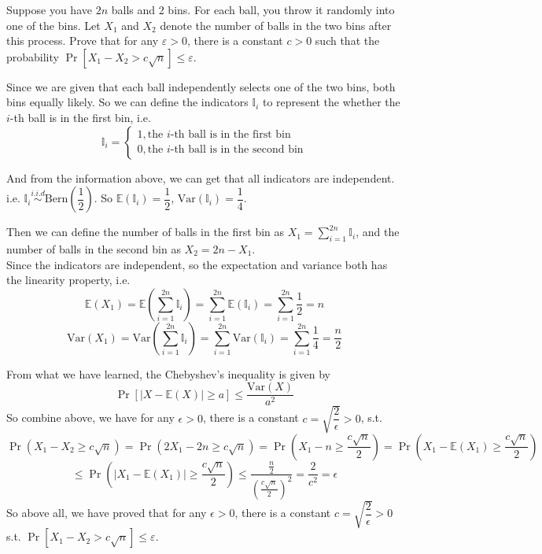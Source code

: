 \problem{}
Suppose you have $2n$ balls and 2 bins.  For each ball, you throw it randomly into one of the bins.  Let $X_1$ and $X_2$ denote the number of balls in the two bins after this process.  Prove that for any  $\varepsilon>0$,  there is a constant  $c>0$  such that the probability $\operatorname{Pr}\left[X_{1}-X_{2}>c \sqrt{n}\right] \leq \varepsilon.$

\solution{}
Since we are given that each ball independently selects one of the two bins, both bins equally likely. So we can define the indicators $\mathbb{I}_i$ to represent the whether the $i$-th ball is in the first bin, i.e.
$$\mathbb{I}_i=\begin{cases}1,\text{the $i$-th ball is in the first bin}\\0,\text{the $i$-th ball is in the second bin}\end{cases}$$

And from the information above, we can get that  all indicators are independent. i.e. $\mathbb{I}_i \stackrel{i.i.d}{\sim} \text{Bern}\left(\dfrac{1}{2}\right)$.
So $\mathbb{E}(\mathbb{I}_i)=\dfrac{1}{2}$, $\text{Var}(\mathbb{I}_i)=\dfrac{1}{4}$.

Then we can define the number of balls in the first bin as $X_1=\sum\limits_{i=1}^{2n}\mathbb{I}_i$, and the number of balls in the second bin as $X_2=2n-X_1$.\\
Since the indicators are independent, so the expectation and variance both has the linearity property, i.e.
$$\mathbb{E}(X_1)=\mathbb{E}\left(\sum\limits_{i=1}^{2n}\mathbb{I}_i\right)=\sum\limits_{i=1}^{2n}\mathbb{E}(\mathbb{I}_i)=\sum\limits_{i=1}^{2n}\dfrac{1}{2}=n$$
$$\text{Var}(X_1)=\text{Var}\left(\sum\limits_{i=1}^{2n}\mathbb{I}_i\right)=\sum\limits_{i=1}^{2n}\text{Var}(\mathbb{I}_i)=\sum\limits_{i=1}^{2n}\dfrac{1}{4}=\dfrac{n}{2}$$

From what we have learned, the Chebyshev's inequality is given by
$$\Pr\left[|X-\mathbb{E}(X)|\geq a\right]\leq \dfrac{\text{Var}(X)}{a^2}$$
So combine above, we have for any $\epsilon>0$, there is a constant $c=\sqrt{\dfrac{2}{\epsilon}}>0$, s.t.
$$\Pr\left(X_1-X_2\geq c\sqrt{n}\right)=\Pr\left(2X_1-2n\geq c\sqrt{n}\right)=\Pr\left(X_1-n\geq \dfrac{c\sqrt{n}}{2}\right)=\Pr\left(X_1-\mathbb{E}(X_1)\geq \dfrac{c\sqrt{n}}{2}\right)$$
$$\leq\Pr\left(\left|X_1-\mathbb{E}(X_1)\right|\geq \dfrac{c\sqrt{n}}{2}\right)\leq\dfrac{\frac{n}{2}}{\left(\frac{c\sqrt{n}}{2}\right)^2}=\dfrac{2}{c^2}=\epsilon$$
So above all, we have proved that for any $\epsilon>0$, there is a constant $c=\sqrt{\dfrac{2}{\epsilon}}>0$ s.t. $\Pr\left[X_{1}-X_{2}>c \sqrt{n}\right] \leq \varepsilon.$



\newpage
